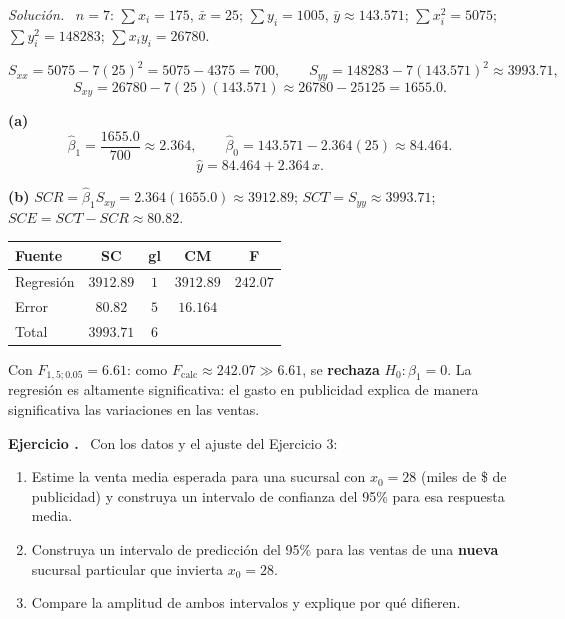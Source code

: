 \documentclass[11pt,a4paper]{article}
\newcounter{ejnum}
\newenvironment{ejercicio}{\refstepcounter{ejnum}\par\medskip\noindent\textbf{Ejercicio \theejnum.}~}{\par}
\newenvironment{solucion}{\par\noindent\textit{Solución.}~}{\par\vspace{1em}}
\begin{document}
\begin{solucion}
$n=7$: $\sum x_i=175$, $\bar x=25$; $\sum y_i=1005$, $\bar y\approx143.571$; $\sum x_i^2=5075$; $\sum y_i^2=148283$; $\sum x_iy_i=26780$.

\[
S_{xx}=5075-7(25)^2=5075-4375=700, \qquad
S_{yy}=148283-7(143.571)^2\approx3993.71,
\]
\[
S_{xy}=26780-7(25)(143.571)\approx26780-25125=1655.0.
\]

\textbf{(a)}
\[
\hat\beta_1=\frac{1655.0}{700}\approx2.364, \qquad \hat\beta_0=143.571-2.364(25)\approx84.464.
\]
\[
\hat y = 84.464+2.364\,x.
\]

\textbf{(b)} $SCR=\hat\beta_1 S_{xy}=2.364(1655.0)\approx3912.89$; $SCT=S_{yy}\approx3993.71$; $SCE=SCT-SCR\approx80.82$.

\begin{table}[htbp]
\centering
\begin{tabular}{lcccc}
\toprule
Fuente & SC & gl & CM & F \\
\midrule
Regresión & $3912.89$ & $1$ & $3912.89$ & $242.07$ \\
Error & $80.82$ & $5$ & $16.164$ & \\
\midrule
Total & $3993.71$ & $6$ & & \\
\bottomrule
\end{tabular}
\end{table}

Con $F_{1,5;0.05}=6.61$: como $F_{\text{calc}}\approx242.07 \gg 6.61$, se \textbf{rechaza} $H_0:\beta_1=0$. La regresión es altamente significativa: el gasto en publicidad explica de manera significativa las variaciones en las ventas.
\end{solucion}

\begin{ejercicio}
Con los datos y el ajuste del Ejercicio 3:
\begin{enumerate}[label=(\alph*)]
\item Estime la venta media esperada para una sucursal con $x_0=28$ (miles de \$ de publicidad) y construya un intervalo de confianza del 95\% para esa respuesta media.
\item Construya un intervalo de predicción del 95\% para las ventas de una \textbf{nueva} sucursal particular que invierta $x_0=28$.
\item Compare la amplitud de ambos intervalos y explique por qué difieren.
\end{enumerate}
\end{ejercicio}
\end{document}
